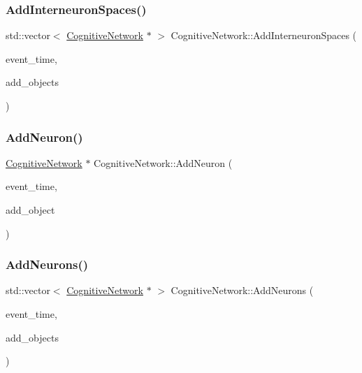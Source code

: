 \subsubsection{\texorpdfstring{Add\+Interneuron\+Spaces()}{AddInterneuronSpaces()}}
{\footnotesize\ttfamily std\+::vector$<$ \mbox{\hyperlink{classCognitiveNetwork}{Cognitive\+Network}} $\ast$ $>$ Cognitive\+Network\+::\+Add\+Interneuron\+Spaces (\begin{DoxyParamCaption}\item[{std\+::chrono\+::time\+\_\+point$<$ \mbox{\hyperlink{universe_8h_a0ef8d951d1ca5ab3cfaf7ab4c7a6fd80}{Clock}} $>$}]{event\+\_\+time,  }\item[{std\+::vector$<$ \mbox{\hyperlink{classCognitiveNetwork}{Cognitive\+Network}} $\ast$$>$}]{add\+\_\+objects }\end{DoxyParamCaption})}

\mbox{\label{classCognitiveNetwork_a8457342637fde2d814c54942c3367416}} 
\subsubsection{\texorpdfstring{Add\+Neuron()}{AddNeuron()}}
{\footnotesize\ttfamily \mbox{\hyperlink{classCognitiveNetwork}{Cognitive\+Network}} $\ast$ Cognitive\+Network\+::\+Add\+Neuron (\begin{DoxyParamCaption}\item[{std\+::chrono\+::time\+\_\+point$<$ \mbox{\hyperlink{universe_8h_a0ef8d951d1ca5ab3cfaf7ab4c7a6fd80}{Clock}} $>$}]{event\+\_\+time,  }\item[{\mbox{\hyperlink{classCognitiveNetwork}{Cognitive\+Network}} $\ast$}]{add\+\_\+object }\end{DoxyParamCaption})}

\mbox{\label{classCognitiveNetwork_ade928e3355db97d3c5d99501ff4a3b69}} 
\subsubsection{\texorpdfstring{Add\+Neurons()}{AddNeurons()}}
{\footnotesize\ttfamily std\+::vector$<$ \mbox{\hyperlink{classCognitiveNetwork}{Cognitive\+Network}} $\ast$ $>$ Cognitive\+Network\+::\+Add\+Neurons (\begin{DoxyParamCaption}\item[{std\+::chrono\+::time\+\_\+point$<$ \mbox{\hyperlink{universe_8h_a0ef8d951d1ca5ab3cfaf7ab4c7a6fd80}{Clock}} $>$}]{event\+\_\+time,  }\item[{std\+::vector$<$ \mbox{\hyperlink{classCognitiveNetwork}{Cognitive\+Network}} $\ast$$>$}]{add\+\_\+objects }\end{DoxyParamCaption})}

